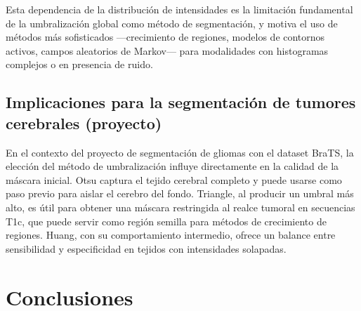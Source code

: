 \documentclass[12pt, a4paper]{article}
\begin{document}
Esta dependencia de la distribución de intensidades es la limitación fundamental de la
umbralización global como método de segmentación, y motiva el uso de métodos más
sofisticados —crecimiento de regiones, modelos de contornos activos, campos aleatorios
de Markov— para modalidades con histogramas complejos o en presencia de ruido.

\subsection{Implicaciones para la segmentación de tumores cerebrales (proyecto)}

En el contexto del proyecto de segmentación de gliomas con el dataset BraTS, la elección
del método de umbralización influye directamente en la calidad de la máscara inicial.
Otsu captura el tejido cerebral completo y puede usarse como paso previo para aislar
el cerebro del fondo. Triangle, al producir un umbral más alto, es útil para obtener
una máscara restringida al realce tumoral en secuencias T1c, que puede servir como
región semilla para métodos de crecimiento de regiones. Huang, con su comportamiento
intermedio, ofrece un balance entre sensibilidad y especificidad en tejidos con
intensidades solapadas.

\section{Conclusiones}
\end{document}
